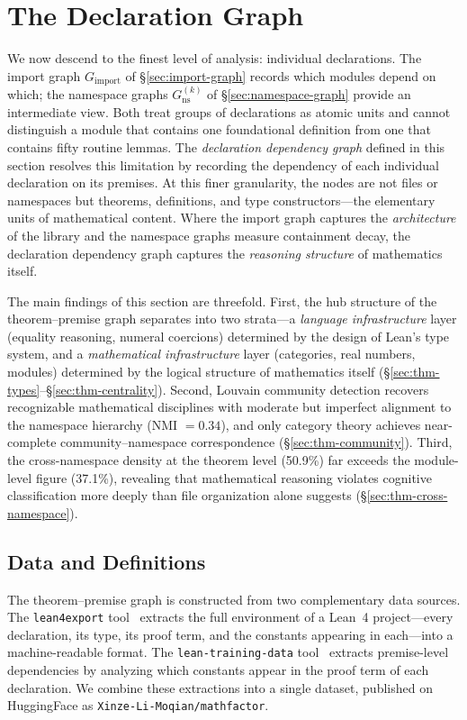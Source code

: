 \section{The Declaration Graph}
\label{sec:theorem-premise}

We now descend to the finest level of analysis: individual declarations. The import graph $G_{\mathrm{import}}$ of \S\ref{sec:import-graph} records which modules depend on which; the namespace graphs $G_{\mathrm{ns}}^{(k)}$ of \S\ref{sec:namespace-graph} provide an intermediate view. Both treat groups of declarations as atomic units and cannot distinguish a module that contains one foundational definition from one that contains fifty routine lemmas. The \emph{declaration dependency graph} defined in this section resolves this limitation by recording the dependency of each individual declaration on its premises. At this finer granularity, the nodes are not files or namespaces but theorems, definitions, and type constructors---the elementary units of mathematical content. Where the import graph captures the \emph{architecture} of the library and the namespace graphs measure containment decay, the declaration dependency graph captures the \emph{reasoning structure} of mathematics itself.

The main findings of this section are threefold. First, the hub structure of the theorem--premise graph separates into two strata---a \emph{language infrastructure} layer (equality reasoning, numeral coercions) determined by the design of Lean's type system, and a \emph{mathematical infrastructure} layer (categories, real numbers, modules) determined by the logical structure of mathematics itself (\S\ref{sec:thm-types}--\S\ref{sec:thm-centrality}). Second, Louvain community detection recovers recognizable mathematical disciplines with moderate but imperfect alignment to the namespace hierarchy (NMI $= 0.34$), and only category theory achieves near-complete community--namespace correspondence (\S\ref{sec:thm-community}). Third, the cross-namespace density at the theorem level (50.9\%) far exceeds the module-level figure (37.1\%), revealing that mathematical reasoning violates cognitive classification more deeply than file organization alone suggests (\S\ref{sec:thm-cross-namespace}).

\subsection{Data and Definitions}
\label{sec:thm-data}

The theorem--premise graph is constructed from two complementary data sources. The \texttt{lean4export} tool~\cite{lean4export} extracts the full environment of a Lean~4 project---every declaration, its type, its proof term, and the constants appearing in each---into a machine-readable format. The \texttt{lean-training-data} tool~\cite{lean_training_data} extracts premise-level dependencies by analyzing which constants appear in the proof term of each declaration. We combine these extractions into a single dataset, published on HuggingFace as \texttt{Xinze-Li-Moqian/mathfactor}.

